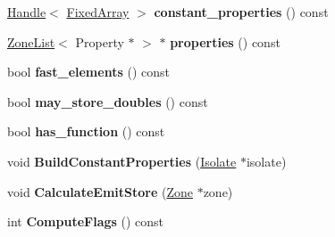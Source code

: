 \begin{DoxyCompactItemize}
\item 
\hypertarget{classv8_1_1internal_1_1_v8___f_i_n_a_l_a2358deca729b1101406b86112b53bd4a}{}\hyperlink{classv8_1_1internal_1_1_handle}{Handle}$<$ \hyperlink{classv8_1_1internal_1_1_fixed_array}{Fixed\+Array} $>$ {\bfseries constant\+\_\+properties} () const \label{classv8_1_1internal_1_1_v8___f_i_n_a_l_a2358deca729b1101406b86112b53bd4a}

\item 
\hypertarget{classv8_1_1internal_1_1_v8___f_i_n_a_l_a04570dc4cd30231341ed3040735c077c}{}\hyperlink{classv8_1_1internal_1_1_zone_list}{Zone\+List}$<$ Property $\ast$ $>$ $\ast$ {\bfseries properties} () const \label{classv8_1_1internal_1_1_v8___f_i_n_a_l_a04570dc4cd30231341ed3040735c077c}

\item 
\hypertarget{classv8_1_1internal_1_1_v8___f_i_n_a_l_ae6df972c779faadd88d48c6fbb2f1b1b}{}bool {\bfseries fast\+\_\+elements} () const \label{classv8_1_1internal_1_1_v8___f_i_n_a_l_ae6df972c779faadd88d48c6fbb2f1b1b}

\item 
\hypertarget{classv8_1_1internal_1_1_v8___f_i_n_a_l_a5652d4b3fa3492dacfe7a95f8491d423}{}bool {\bfseries may\+\_\+store\+\_\+doubles} () const \label{classv8_1_1internal_1_1_v8___f_i_n_a_l_a5652d4b3fa3492dacfe7a95f8491d423}

\item 
\hypertarget{classv8_1_1internal_1_1_v8___f_i_n_a_l_aa277708c95eb1e73a1500972c96bb85d}{}bool {\bfseries has\+\_\+function} () const \label{classv8_1_1internal_1_1_v8___f_i_n_a_l_aa277708c95eb1e73a1500972c96bb85d}

\item 
\hypertarget{classv8_1_1internal_1_1_v8___f_i_n_a_l_ac066405804f1a6252b7493bade155c2b}{}void {\bfseries Build\+Constant\+Properties} (\hyperlink{classv8_1_1internal_1_1_isolate}{Isolate} $\ast$isolate)\label{classv8_1_1internal_1_1_v8___f_i_n_a_l_ac066405804f1a6252b7493bade155c2b}

\item 
\hypertarget{classv8_1_1internal_1_1_v8___f_i_n_a_l_a1473d50ead29ec3e2b58814e32069e66}{}void {\bfseries Calculate\+Emit\+Store} (\hyperlink{classv8_1_1internal_1_1_zone}{Zone} $\ast$zone)\label{classv8_1_1internal_1_1_v8___f_i_n_a_l_a1473d50ead29ec3e2b58814e32069e66}

\item 
\hypertarget{classv8_1_1internal_1_1_v8___f_i_n_a_l_afdd867223d3bc2f392aa1c1f76b3bbd6}{}int {\bfseries Compute\+Flags} () const \label{classv8_1_1internal_1_1_v8___f_i_n_a_l_afdd867223d3bc2f392aa1c1f76b3bbd6}


\end{DoxyCompactItemize}
